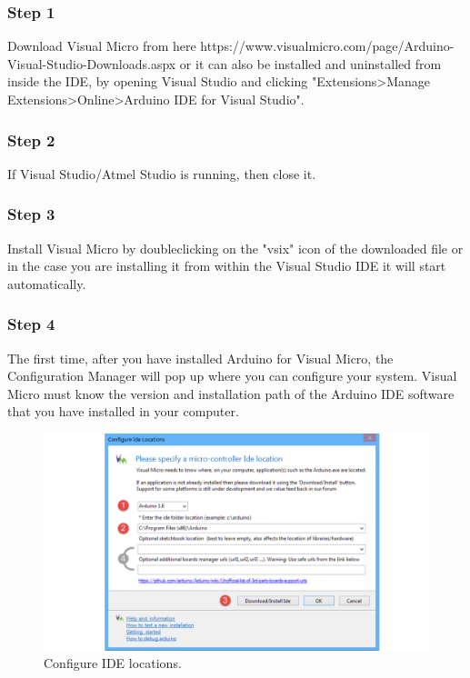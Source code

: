 \begin{refsection}
	
	\subsubsection{Step 1}
	Download Visual Micro from here https://www.visualmicro.com/page/Arduino-Visual-Studio-Downloads.aspx or it can also be installed and uninstalled from inside the IDE, by opening Visual Studio and clicking "Extensions>Manage Extensions>Online>Arduino IDE for Visual Studio".
	
	\subsubsection{Step 2}
	If Visual Studio/Atmel Studio is running, then close it.
	
	\subsubsection{Step 3}
	Install Visual Micro by doubleclicking on the "vsix" icon of the downloaded file or in the case you are installing it from within the Visual Studio IDE it will start automatically.
	
	\subsubsection{Step 4}
	
	The first time, after you have installed Arduino for Visual Micro, the Configuration Manager will pop up where you can configure your system. Visual Micro must know the version and installation path of the Arduino IDE software that you have installed in your computer.
	
	\begin{figure}[H]
		\centering
		\includegraphics[width=1\linewidth]{./sdf/arduino_quantum_rx/figures/configureIDE.pdf}
		\caption{Configure IDE locations.}
		\label{configureIDE}
	\end{figure}
	

\end{refsection}
